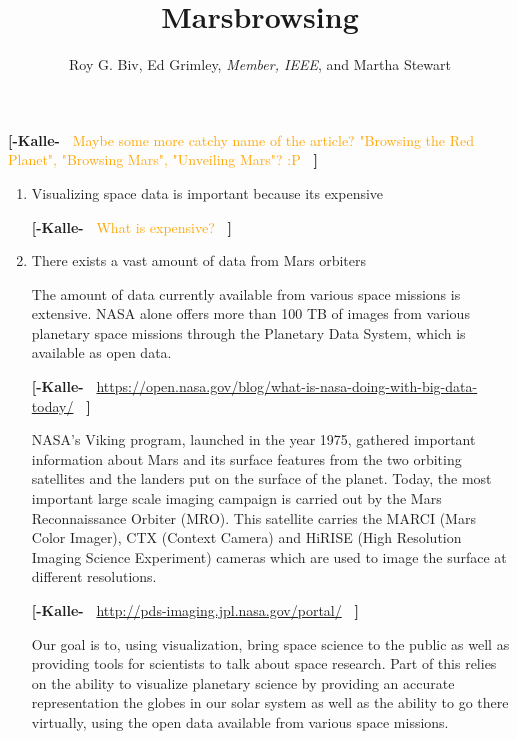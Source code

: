 \documentclass[journal]{vgtc}                %
\title{Marsbrowsing}
\author{Roy G. Biv, Ed Grimley, \textit{Member, IEEE}, and Martha Stewart}
\newcommand{\kallecomment}[1]{\textbf{[-Kalle-~}
    \textcolor{orange}{#1}
    \textbf{~]}}
\begin{document}

 \label{sec:introduction}
\maketitle
\kallecomment{Maybe some more catchy name of the article? "Browsing the Red Planet", "Browsing Mars", "Unveiling Mars"? :P}

\begin{enumerate}
\item Visualizing space data is important because its expensive

\kallecomment{What is expensive?}

\item There exists a vast amount of data from Mars orbiters

The amount of data currently available from various space missions is extensive. NASA alone offers more than 100 TB of images from various planetary space missions through the Planetary Data System, which is available as open data.

\kallecomment{\url{https://open.nasa.gov/blog/what-is-nasa-doing-with-big-data-today/}}

NASA's Viking program, launched in the year 1975, gathered important information about Mars and its surface features from the two orbiting satellites and the landers put on the surface of the planet. Today, the most important large scale imaging campaign is carried out by the Mars Reconnaissance Orbiter (MRO). This satellite carries the MARCI (Mars Color Imager), CTX (Context Camera) and HiRISE (High Resolution Imaging Science Experiment) cameras which are used to image the surface at different resolutions.

\kallecomment{\url{http://pds-imaging.jpl.nasa.gov/portal/}}

Our goal is to, using visualization, bring space science to the public as well as providing tools for scientists to talk about space research. Part of this relies on the ability to visualize planetary science by providing an accurate representation the globes in our solar system as well as the ability to go there virtually, using the open data available from various space missions.


\end{enumerate}
\end{document}
